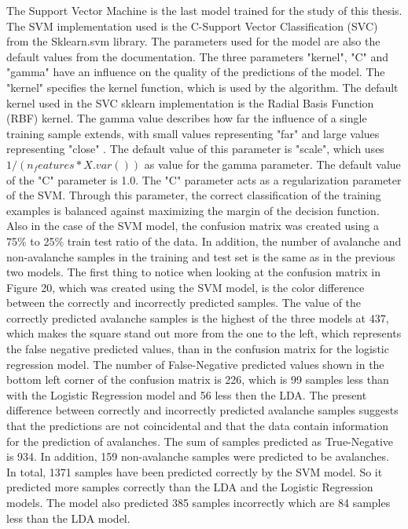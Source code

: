 \documentclass[../masterarbeit.tex]{subfiles}
\begin{document}
The Support Vector Machine is the last model trained for the study of this thesis. The SVM implementation used is the C-Support Vector Classification (SVC) \textcite[]{Scikit-learn-svc:2022} from the Sklearn.svm library. The parameters used for the model are also the default values from the documentation. The three parameters "kernel", "C" and "gamma" have an influence on the quality of the predictions of the model. The "kernel" specifies the kernel function, which is used by the algorithm. The default kernel used in the SVC sklearn implementation is the  Radial Basis Function (RBF) kernel. \autocite[]{Scikit-learn-svc:2022} The gamma value describes how far the influence of a single training sample extends, with small values representing "far" and large values representing "close" \textcite[]{Scikit-learn-rbf-para:2022}. The default value of this parameter is "scale", which uses \(1 / (n_features * X.var())\) as value for the gamma parameter. The default value of the "C" parameter is 1.0. \autocite{Scikit-learn-svc:2022} The "C" parameter acts as a regularization parameter of the SVM. Through this parameter, the correct classification of the training examples is balanced against maximizing the margin of the decision function. \autocite[]{Scikit-learn-rbf-para:2022} \\
Also in the case of the SVM model, the confusion matrix was created using a 75\% to 25\% train test ratio of the data. In addition, the number of avalanche and non-avalanche samples in the training and test set is the same as in the previous two models. The first thing to notice when looking at the confusion matrix in Figure 20, which was created using the SVM model, is the color difference between the correctly and incorrectly predicted samples. The value of the correctly predicted avalanche samples is the highest of the three models at 437, which makes the square stand out more from the one to the left, which represents the false negative predicted values, than in the confusion matrix for the logistic regression model. The number of False-Negative predicted values shown in the bottom left corner of the confusion matrix is 226, which is 99 samples less than with the Logistic Regression model and 56 less then the LDA. The present difference between correctly and incorrectly predicted avalanche samples suggests that the predictions are not coincidental and that the data contain information for the prediction of avalanches. The sum of samples predicted as True-Negative is 934. In addition, 159 non-avalanche samples were predicted to be avalanches. In total, 1371 samples have been predicted correctly by the SVM model. So it predicted more samples correctly than the LDA and the Logistic Regression models. The model also predicted 385 samples incorrectly which are 84 samples less than the LDA model. \\~\\
\end{document}
